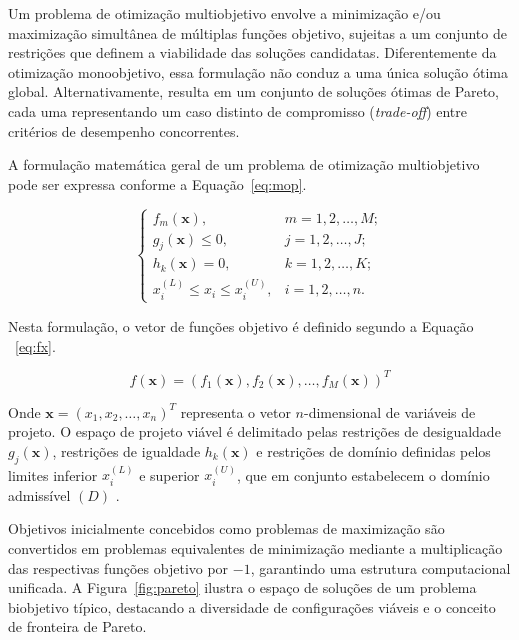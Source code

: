Um problema de otimização multiobjetivo envolve a minimização e/ou maximização simultânea de múltiplas funções objetivo, sujeitas a um conjunto de restrições que definem a viabilidade das soluções candidatas.
Diferentemente da otimização monoobjetivo, essa formulação não conduz a uma única solução ótima global.
Alternativamente, resulta em um conjunto de soluções ótimas de Pareto, cada uma representando um caso distinto de compromisso (\textit{trade-off}) entre critérios de desempenho concorrentes.
 
A formulação matemática geral de um problema de otimização multiobjetivo pode ser expressa conforme a Equação~\eqref{eq:mop}.
 
\begin{equation}
\left\{
\begin{array}{ll}
f_m(\mathbf{x}), & m = 1,2,\ldots,M; \\
g_j(\mathbf{x}) \leq 0, & j = 1,2,\ldots,J; \\
h_k(\mathbf{x}) = 0, & k = 1,2,\ldots,K; \\
x_i^{(L)} \leq x_i \leq x_i^{(U)}, & i = 1,2,\ldots,n.
\end{array}
\right.
\label{eq:mop}
\end{equation}
 
 Nesta formulação, o vetor de funções objetivo é definido segundo a Equação
 ~\eqref{eq:fx}.
 
 \begin{equation}
 f(\mathbf{x}) = \left(f_1(\mathbf{x}), f_2(\mathbf{x}), \ldots, f_M(\mathbf{x})\right)^T\label{eq:fx}
 \end{equation}
 
 Onde $\mathbf{x} = (x_1, x_2, \ldots, x_n)^T$ 
representa o vetor $n$-dimensional de variáveis de projeto.
O espaço de projeto viável é delimitado pelas restrições de desigualdade $g_j(\mathbf{x})$, restrições de igualdade $h_k(\mathbf{x})$ e restrições de domínio definidas pelos limites inferior $x_i^{(L)}$ e superior $x_i^{(U)}$, que em conjunto estabelecem o domínio admissível $(D)$ \parencite{DEB2009}.

Objetivos inicialmente concebidos como problemas de maximização são convertidos em problemas equivalentes de minimização mediante a multiplicação das respectivas funções objetivo por $-1$, garantindo uma estrutura computacional unificada.
A Figura~\ref{fig:pareto} ilustra o espaço de soluções de um problema biobjetivo típico, destacando a diversidade de configurações viáveis e o conceito de fronteira de Pareto.

